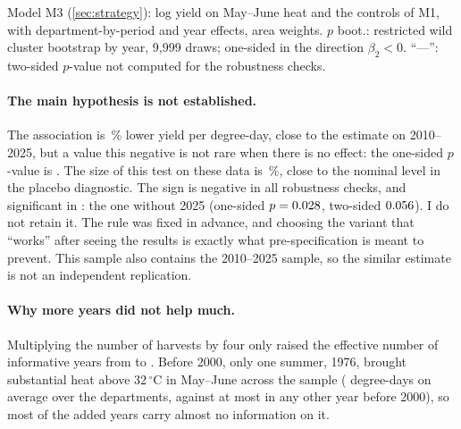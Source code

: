 \begin{table}[H]
\centering
\small
\caption{Wheat 1959--2025: heat above 32\,$^{\circ}$C in May--June (83 departments, \QtwoN{} observations)}
\label{tab:wheat-long}
\begin{threeparttable}

\begin{tablenotes}\footnotesize
\item Model M3 (\cref{sec:strategy}): log yield on May--June heat and the controls of M1, with department-by-period and year effects, area weights. $p$ boot.: restricted wild cluster bootstrap by year, 9,999 draws; one-sided in the direction $\beta_2 < 0$. ``---'': two-sided $p$-value not computed for the robustness checks.
\end{tablenotes}
\end{threeparttable}
\end{table}

\paragraph{The main hypothesis is not established.} The association is \QtwoPct\,\% lower yield per degree-day, close to the estimate on 2010--2025, but a value this negative is not rare when there is no effect: the one-sided $p$-value is \QtwoP. The size of this test on these data is \QtwoSizeWCR\,\%, close to the nominal level in the placebo diagnostic. The sign is negative in all \QtwoRobTot{} robustness checks, and significant in \QtwoRobSig: the one without 2025 (one-sided $p = 0.028$, two-sided $0.056$). I do not retain it. The rule was fixed in advance, and choosing the variant that ``works'' after seeing the results is exactly what pre-specification is meant to prevent. This sample also contains the 2010--2025 sample, so the similar estimate is not an independent replication.

\paragraph{Why more years did not help much.} Multiplying the number of harvests by four only raised the effective number of informative years from \NeffWheat{} to \NeffWheatLong. Before 2000, only one summer, 1976, brought substantial heat above 32\,$^{\circ}$C in May--June across the sample (\HeatSeventySix{} degree-days on average over the departments, against at most \HeatPreTwoThousandOtherMax{} in any other year before 2000), so most of the added years carry almost no information on it.

